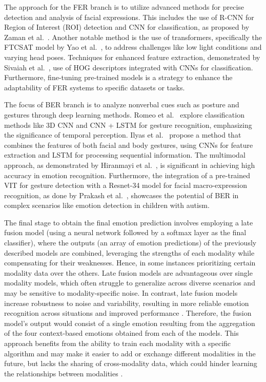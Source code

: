 \documentclass[runningheads]{llncs}
\begin{document}
The approach for the FER branch is to utilize advanced methods for precise detection and analysis of facial expressions. This includes the use of R-CNN for Region of Interest (ROI) detection and CNN for classification, as proposed by Zaman et al.~\cite{Zaman2022}. Another notable method is the use of transformers, specifically the FTCSAT model by Yao et al.~\cite{Yao2023}, to address challenges like low light conditions and varying head poses. Techniques for enhanced feature extraction, demonstrated by Sivaiah et al.~\cite{Bellamkonda2020}, use of HOG descriptors integrated with CNNs for classification. Furthermore, fine-tuning pre-trained models is a strategy to enhance the adaptability of FER systems to specific datasets or tasks.

The focus of BER branch is to analyze nonverbal cues such as posture and gestures through deep learning methods. Romeo et al.~\cite{Romeo2021} explore classification methods like 3D CNN and CNN + LSTM for gesture recognition, emphasizing the significance of temporal perception. Ilyas et al.~\cite{Ilyas2021} propose a method that combines the features of both facial and body gestures, using CNNs for feature extraction and LSTM for processing sequential information. The multimodal approach, as demonstrated by Hiranmayi et al.~\cite{Ranganathan2016}, is significant in achieving high accuracy in emotion recognition. Furthermore, the integration of a pre-trained VIT for gesture detection with a Resnet-34 model for facial macro-expression recognition, as done by Prakash et al.~\cite{Prakash2023}, showcases the potential of BER in complex scenarios like emotion detection in children with autism.

The final stage to obtain the final emotion prediction involves employing a late fusion model (using a neural network followed by a softmax layer as the final classifier), where the outputs (an array of emotion predictions) of the previously described models are combined, leveraging the strengths of each modality while compensating for their weaknesses. Hence, in some instances prioritizing certain modality data over the others. Late fusion models are advantageous over single modality models, which often struggle to generalize across diverse scenarios and may be sensitive to modality-specific noise. In contrast, late fusion models increase robustness to noise and variability, resulting in more reliable emotion recognition across situations and improved performance \cite{zhu_multimodal_2023, sleeman_multimodal_2022}. Therefore, the fusion model's output would consist of a single emotion resulting from the aggregation of the four context-based emotions obtained from each of the models. This approach benefits from the ability to train each modality with a specific algorithm and may make it easier to add or exchange different modalities in the future, but lacks the sharing of cross-modality data, which could hinder learning the relationships between modalities \cite{sleeman_multimodal_2022}.
\end{document}
